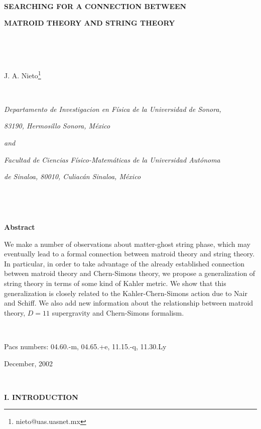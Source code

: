 \documentclass[a4paper,12pt]{article}
\begin{document}
\bigskip

\bigskip\ 

\begin{center}
\textbf{SEARCHING FOR A CONNECTION BETWEEN}

\textbf{MATROID THEORY AND STRING THEORY}

\bigskip\ 

\smallskip\ 

J. A. Nieto\footnote[1]{%
nieto@uas.uasnet.mx}

\smallskip\ 

\textit{Departamento de Investigacion en F\'{i}sica de la Universidad de
Sonora,}

\textit{83190, Hermosillo Sonora, M\'{e}xico}

\textit{and}

\textit{Facultad de Ciencias F\'{i}sico-Matem\'{a}ticas de la Universidad
Aut\'{o}noma}

\textit{de Sinaloa, 80010, Culiac\'{a}n Sinaloa, M\'{e}xico}

\bigskip\ 

\bigskip\ 

\textbf{Abstract}
\end{center}

We make a number of observations about matter-ghost string phase, which may
eventually lead to a formal connection between matroid theory and string
theory. In particular, in order to take advantage of the already established
connection between matroid theory and Chern-Simons theory, we propose a
generalization of string theory in terms of some kind of Kahler metric. We
show that this generalization is closely related to the Kahler-Chern-Simons
action due to Nair and Schiff. We also add new information about the
relationship between matroid theory, $D=11$ supergravity and Chern-Simons
formalism.

\bigskip\ 

Pacs numbers: 04.60.-m, 04.65.+e, 11.15.-q, 11.30.Ly

December, 2002

\newpage\ 

\noindent \textbf{I. INTRODUCTION}

\bigskip
\end{document}
